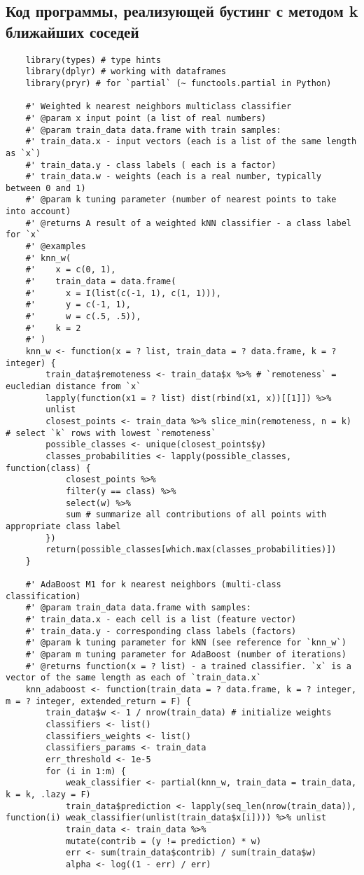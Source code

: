\documentclass[a4paper,12pt]{article} %
\begin{document}
\subsection{Код программы, реализующей бустинг с методом k ближайших соседей}
\begin{lstlisting}
	library(types) # type hints
	library(dplyr) # working with dataframes
	library(pryr) # for `partial` (~ functools.partial in Python)
	
	#' Weighted k nearest neighbors multiclass classifier
	#' @param x input point (a list of real numbers)
	#' @param train_data data.frame with train samples:
	#' train_data.x - input vectors (each is a list of the same length as `x`)
	#' train_data.y - class labels ( each is a factor)
	#' train_data.w - weights (each is a real number, typically between 0 and 1)
	#' @param k tuning parameter (number of nearest points to take into account)
	#' @returns A result of a weighted kNN classifier - a class label for `x`
	#' @examples
	#' knn_w(
	#'    x = c(0, 1),
	#'    train_data = data.frame(
	#'      x = I(list(c(-1, 1), c(1, 1))),
	#'      y = c(-1, 1),
	#'      w = c(.5, .5)),
	#'    k = 2
	#' )
	knn_w <- function(x = ? list, train_data = ? data.frame, k = ? integer) {
		train_data$remoteness <- train_data$x %>% # `remoteness` = eucledian distance from `x`
		lapply(function(x1 = ? list) dist(rbind(x1, x))[[1]]) %>%
		unlist
		closest_points <- train_data %>% slice_min(remoteness, n = k) # select `k` rows with lowest `remoteness`
		possible_classes <- unique(closest_points$y)
		classes_probabilities <- lapply(possible_classes, function(class) {
			closest_points %>%
			filter(y == class) %>%
			select(w) %>%
			sum # summarize all contributions of all points with appropriate class label
		})
		return(possible_classes[which.max(classes_probabilities)])
	}
	
	#' AdaBoost M1 for k nearest neighbors (multi-class classification)
	#' @param train_data data.frame with samples:
	#' train_data.x - each cell is a list (feature vector)
	#' train_data.y - corresponding class labels (factors)
	#' @param k tuning parameter for kNN (see reference for `knn_w`)
	#' @param m tuning parameter for AdaBoost (number of iterations)
	#' @returns function(x = ? list) - a trained classifier. `x` is a vector of the same length as each of `train_data.x`
	knn_adaboost <- function(train_data = ? data.frame, k = ? integer, m = ? integer, extended_return = F) {
		train_data$w <- 1 / nrow(train_data) # initialize weights
		classifiers <- list()
		classifiers_weights <- list()
		classifiers_params <- train_data
		err_threshold <- 1e-5
		for (i in 1:m) {
			weak_classifier <- partial(knn_w, train_data = train_data, k = k, .lazy = F)
			train_data$prediction <- lapply(seq_len(nrow(train_data)), function(i) weak_classifier(unlist(train_data$x[i]))) %>% unlist
			train_data <- train_data %>%
			mutate(contrib = (y != prediction) * w)
			err <- sum(train_data$contrib) / sum(train_data$w)
			alpha <- log((1 - err) / err)
			

\end{lstlisting}
\end{document}
